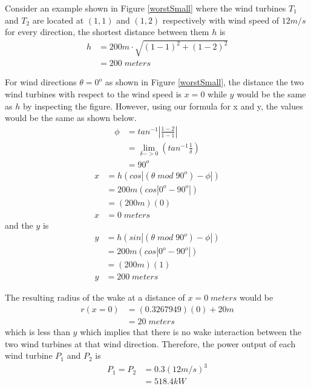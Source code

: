         Consider an example shown in Figure \ref{worstSmall} where the wind turbines $T_1$ and $T_2$ are located at $(1,1)$ and $(1,2)$ respectively with wind speed of $12m/s$ for every direction, the shortest distance between them $h$ is
        \begin{align*}
            h
            &=200m\cdot \sqrt{(1-1)^2 + (1-2)^2} \\
            &=200\;meters
        \end{align*}
        
        For wind directions $\theta=0^o$ as shown in Figure \ref{worstSmall}, the distance the two wind turbines with respect to the wind speed is $x=0$ while $y$ would be the same as $h$ by inspecting the figure. However, using our formula for x and y, the values would be the same as shown below.
        \begin{align*}
            \phi
        	&= tan^{-1} \left| \frac{1-2}{1-1} \right| \\
        	&= \lim_{\delta -> 0} \left( tan^{-1} \frac{1}{\delta} \right) \\
        	&= 90^o
        \end{align*}
            \begin{align*}
            x &= h(cos|(\theta\;mod\;90^{o})-\phi|) \\
              &= 200m(cos|0^{o}-90^{o}|) \\
              &= (200m)(0) \\
            x &= 0\;meters
        \end{align*}
    and the $y$ is
        \begin{align*}
            y &= h(sin|(\theta\;mod\;90^{o})-\phi|) \\
              &= 200m(cos|0^{o}-90^{o}|) \\
              &= (200m)(1) \\
            y &= 200\;meters
        \end{align*}
        
        The resulting radius of the wake at a distance of $x=0\;meters$ would be
        \begin{align*}
            r(x=0)&=(0.3267949)(0) + 20m \\
            &= 20 \;meters
        \end{align*}
        which is less than $y$ which implies that there is no wake interaction between the two wind turbines at that wind direction. Therefore, the power output of each wind turbine $P_1$ and $P_2$ is
        \begin{align*}
            P_1=P_2
            &=0.3(12m/s)^3 \\
            &= 518.4kW
        \end{align*}
        
